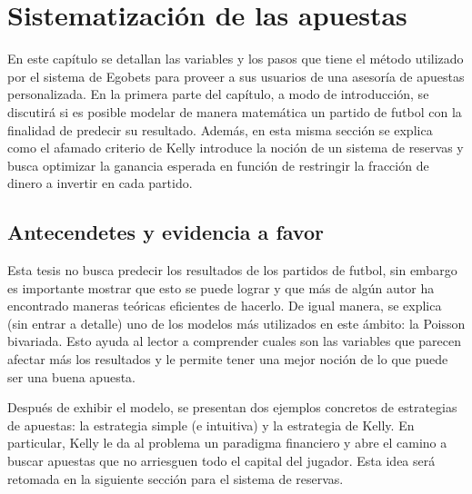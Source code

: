 \graphicspath{{/Users/brunomedina/Dropbox/Tesis-Egobets/egobets-notas/resources/}}

\chapter{Sistematización de las apuestas}
\label{chap:mate}


En este capítulo se detallan las variables y los pasos que tiene el método utilizado por el sistema de Egobets para proveer a sus usuarios de una asesoría de apuestas personalizada. En la primera parte del capítulo, a modo de introducción, se discutirá si es posible modelar de manera matemática un partido de futbol con la finalidad de predecir su resultado. Además, en esta misma sección se explica como el afamado criterio de Kelly introduce la noción de un sistema de reservas y busca optimizar la ganancia esperada en función de restringir la fracción de dinero a invertir en cada partido.

\section{Antecendetes y evidencia a favor}
\label{sec:evidencia}

Esta tesis no busca predecir los resultados de los partidos de futbol, sin embargo es importante mostrar que esto se puede lograr y que más de algún autor ha encontrado maneras teóricas eficientes de hacerlo. De igual manera, se explica (sin entrar a detalle) uno de los modelos más utilizados en este ámbito: la Poisson bivariada. Esto ayuda al lector a comprender cuales son las variables que parecen afectar más los resultados y le permite tener una mejor noción de lo que puede ser una buena apuesta.

Después de exhibir el modelo, se presentan dos ejemplos concretos de estrategias de apuestas: la estrategia simple (e intuitiva) y la estrategia de Kelly. En particular, Kelly le da al problema un paradigma financiero y abre el camino a buscar apuestas que no arriesguen todo el capital del jugador. Esta idea será retomada en la siguiente sección para el sistema de reservas.

